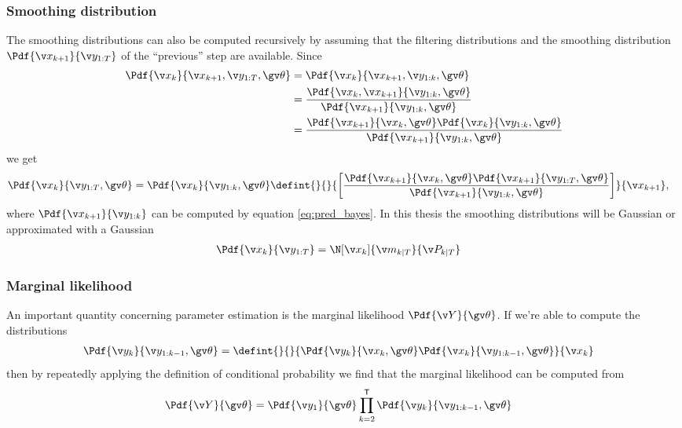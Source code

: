 \subsubsection*{Smoothing distribution}
The smoothing distributions can also be computed recursively by assuming that the filtering distributions
and the smoothing distribution $\Pdf{\x_{k+1}}{\y_{1:T}}$ of the ``previous'' step are available.
Since
\begin{align*}
	\Pdf{\xk}{\x_{k+1},\y_{1:T},\Th}&=\Pdf{\xk}{\x_{k+1},\y_{1:k},\Th}\\
	&=\frac{\Pdf{\xk,\x_{k+1}}{\y_{1:k},\Th}}{\Pdf{\x_{k+1}}{\y_{1:k},\Th}}\\
	&=\frac{\Pdf{\x_{k+1}}{\xk,\Th}\Pdf{\xk}{\y_{1:k},\Th}}{\Pdf{\x_{k+1}}{\y_{1:k},\Th}}
\end{align*}
we get
\begin{align}
	\Pdf{\xk}{\y_{1:T},\Th}&=\Pdf{\xk}{\y_{1:k},\Th}\defint{}{}{\left[\frac{\Pdf{\x_{k+1}}{\xk,\Th}\Pdf{\x_{k+1}}{\y_{1:T},\Th}}{\Pdf{\x_{k+1}}{\y_{1:k},\Th}}\right]}{\x_{k+1}},
	\label{eq:smooth_bayes}
\end{align}
where $\Pdf{\x_{k+1}}{\y_{1:k}}$ can be computed by equation \eqref{eq:pred_bayes}.
In this thesis the smoothing distributions will be Gaussian or approximated with a Gaussian
\begin{align}
	\Pdf{\xk}{\y_{1:T}}&=\N[\xk]{\m_{k|T}}{\P_{k|T}}
\end{align}

\subsubsection*{Marginal likelihood}

An important quantity concerning parameter estimation is the marginal likelihood $\Pdf{\Y}{\Th}$. 
If we're able to compute the distributions
\begin{align}
	\Pdf{\y_k}{\y_{1:k-1},\Th}&=\defint{}{}{\Pdf{\yk}{\xk,\Th}\Pdf{\xk}{\y_{1:k-1},\Th}}{\xk}
\end{align}
then by repeatedly applying the definition of conditional probability 
we find that the marginal likelihood can be computed from
\begin{align}
	\Pdf{\Y}{\Th}&=\Pdf{\y_1}{\Th}\prod_{k=2}^\tr \Pdf{\y_k}{\y_{1:k-1},\Th}
	\label{eq:lh_factorization}
\end{align}





